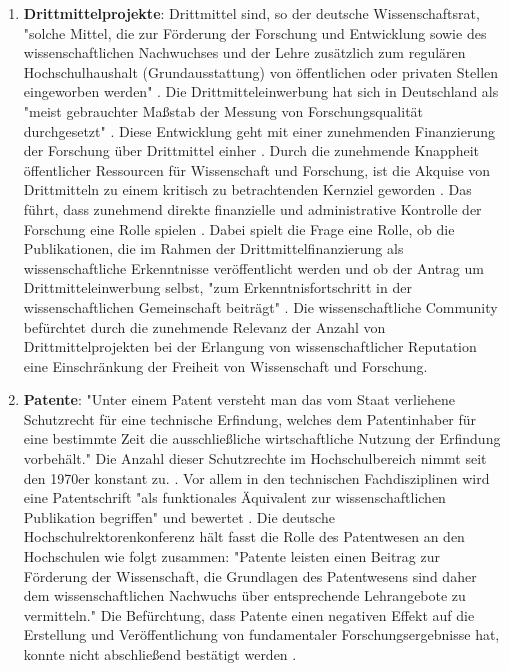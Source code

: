 \begin{enumerate}
\item \textbf{Drittmittelprojekte}: Drittmittel sind, so der deutsche Wissenschaftsrat, "solche Mittel, die zur Förderung der Forschung und Entwicklung sowie des wissenschaftlichen Nachwuchses und der Lehre zusätzlich zum regulären Hochschulhaushalt (Grundausstattung) von öffentlichen oder privaten Stellen eingeworben werden" \cite{wr_2014}. Die Drittmitteleinwerbung hat sich in Deutschland als "meist gebrauchter Maßstab der Messung von Forschungsqualität durchgesetzt" \cite{M_nch_2006}. Diese Entwicklung geht mit einer zunehmenden Finanzierung der Forschung über Drittmittel einher \cite{Neidhardt_2010} \cite{Jansen_2007} \cite{simon_2009_wissenschaft_governance}. Durch die zunehmende Knappheit öffentlicher Ressourcen für Wissenschaft und Forschung, ist die Akquise von Drittmitteln zu einem kritisch zu betrachtenden Kernziel geworden \cite{Jansen_2007}. Das führt, dass zunehmend direkte finanzielle und administrative Kontrolle der Forschung eine Rolle spielen \cite{Barl_sius_2008}. Dabei spielt die Frage eine Rolle, ob die Publikationen, die im Rahmen der Drittmittelfinanzierung als wissenschaftliche Erkenntnisse veröffentlicht werden und ob der Antrag um Drittmitteleinwerbung selbst, "zum Erkenntnisfortschritt in der wissenschaftlichen Gemeinschaft beiträgt" \cite{M_nch_2006}. Die wissenschaftliche Community befürchtet durch die zunehmende Relevanz der Anzahl von Drittmittelprojekten bei der Erlangung von wissenschaftlicher Reputation eine Einschränkung der Freiheit von Wissenschaft und Forschung.
\item \textbf{Patente}: "Unter einem Patent versteht man das vom Staat verliehene Schutzrecht für eine technische Erfindung, welches dem Patentinhaber für eine bestimmte Zeit die ausschließliche wirtschaftliche Nutzung der Erfindung vorbehält." \cite{greif_2003_patente} Die Anzahl dieser Schutzrechte im Hochschulbereich nimmt seit den 1970er konstant zu. \cite{schmoch_2003_hochschulforschung} \cite{Fabrizio_2008}. Vor allem in den technischen Fachdisziplinen wird eine Patentschrift "als funktionales Äquivalent zur wissenschaftlichen Publikation begriffen" und bewertet \cite{mersch_2014_patente}. Die deutsche Hochschulrektorenkonferenz hält fasst die Rolle des Patentwesen an den Hochschulen wie folgt zusammen: "Patente leisten einen Beitrag zur Förderung der Wissenschaft, die Grundlagen des Patentwesens sind daher dem wissenschaftlichen Nachwuchs über entsprechende Lehrangebote zu vermitteln." \cite{suchen-Position-HRK} Die Befürchtung, dass Patente einen negativen Effekt auf die Erstellung und Veröffentlichung von fundamentaler Forschungsergebnisse hat, konnte nicht abschließend bestätigt werden \cite{Fabrizio_2008}.

\end{enumerate}
